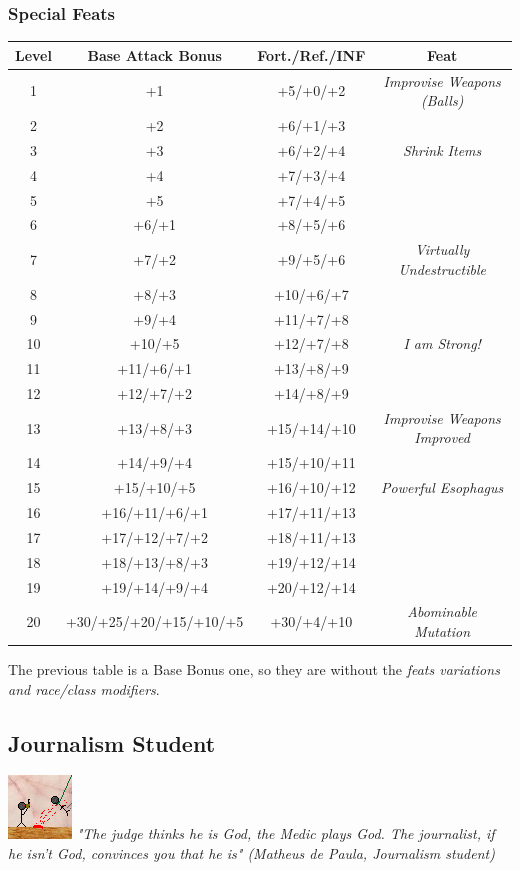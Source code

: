 \documentclass[ letterpaper,12pt]{article}
\begin{document}
\subsubsection{Special Feats}

\begin{center} \begin{tabular}{|c||c|c|c|}
\hline
{\bf Level}&{\bf Base Attack Bonus}&{\bf Fort./Ref./INF}&{\bf Feat}\\
\hline
1&+1&+5/+0/+2&{\it Improvise Weapons (Balls)}\\
\hline
2&+2&+6/+1/+3&\\
\hline
3&+3&+6/+2/+4&{\it Shrink Items}\\
\hline
4&+4&+7/+3/+4&\\
\hline
5&+5&+7/+4/+5&\\
\hline
6&+6/+1&+8/+5/+6&\\
\hline
7&+7/+2&+9/+5/+6&{\it Virtually Undestructible}\\
\hline
8&+8/+3&+10/+6/+7&\\
\hline
9&+9/+4&+11/+7/+8&\\
\hline
10&+10/+5&+12/+7/+8&{\it I am Strong!}\\
\hline
11&+11/+6/+1&+13/+8/+9&\\
\hline
12&+12/+7/+2&+14/+8/+9&\\
\hline
13&+13/+8/+3&+15/+14/+10&{\it Improvise Weapons Improved}\\
\hline
14&+14/+9/+4&+15/+10/+11&\\
\hline
15&+15/+10/+5&+16/+10/+12&{\it Powerful Esophagus}\\
\hline
16&+16/+11/+6/+1&+17/+11/+13&\\
\hline
17&+17/+12/+7/+2&+18/+11/+13&\\
\hline
18&+18/+13/+8/+3&+19/+12/+14&\\
\hline
19&+19/+14/+9/+4&+20/+12/+14&\\
\hline
20&+30/+25/+20/+15/+10/+5&+30/+4/+10&{\it Abominable Mutation}\\
\hline
\end{tabular} \end{center}

The previous table is a Base Bonus one, so they are without the {\it feats variations and race/class modifiers}.\\

\subsection{Journalism Student}
\includegraphics{../data/classes/Img/jornalismo.png}
{\it "The judge thinks he is God, the Medic plays God. The journalist, if he isn't God, convinces you that he is" (Matheus de Paula, Journalism student)}\\
\end{document}
